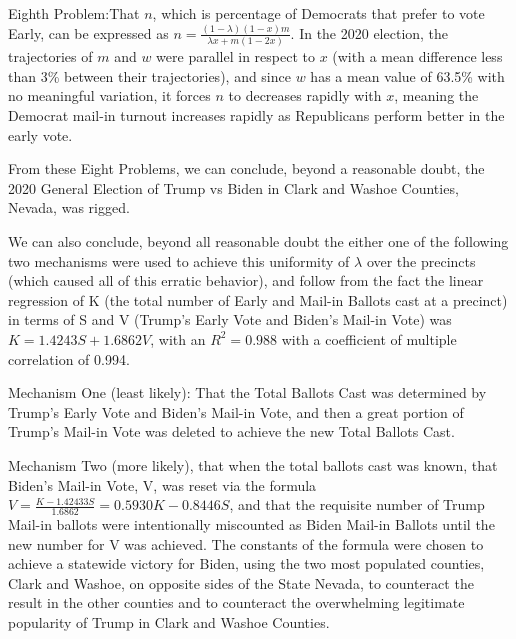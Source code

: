 Eighth Problem:That $n$, which is percentage of Democrats that prefer to vote Early, can be expressed as $n=\frac{(1-\lambda)(1-x)m}{\lambda x+m(1-2x)}$. In the 2020 election, the trajectories of $m$ and $w$ were parallel in respect to $x$ (with a mean difference less than 3\% between their trajectories), and since $w$ has a mean value of 63.5\% with no meaningful variation, it forces $n$ to decreases rapidly with $x$, meaning the Democrat mail-in turnout increases rapidly as Republicans perform better in the early vote.

From these Eight Problems, we can conclude, beyond a reasonable doubt, the 2020 General Election of Trump vs Biden in Clark and Washoe Counties, Nevada, was rigged.

We can also conclude, beyond all reasonable doubt the either one of the following two mechanisms were used to achieve this uniformity of $\lambda$ over the precincts (which caused all of this erratic behavior), and follow from the fact the linear regression of K (the total number of Early and Mail-in Ballots cast at a precinct) in terms of S and V (Trump's Early Vote and Biden's Mail-in Vote) was $K=1.4243S+1.6862V$, with an $R^2=0.988$ with a coefficient of multiple correlation of 0.994.

Mechanism One (least likely): That the Total Ballots Cast was determined by Trump's Early Vote and Biden's Mail-in Vote, and then a great portion of Trump's Mail-in Vote was deleted to achieve the new Total Ballots Cast.

Mechanism Two (more likely), that when the total ballots cast was known, that Biden's Mail-in Vote, V, was reset via the formula $V=\frac{K-1.42433S}{1.6862}=0.5930K-0.8446S$, and that the requisite number of Trump Mail-in ballots were intentionally miscounted as Biden Mail-in Ballots until the new number for V was achieved. The constants of the formula were chosen to achieve a statewide victory for Biden, using the two most populated counties, Clark and Washoe, on opposite sides of the State Nevada, to counteract the result in the other counties and to counteract the overwhelming legitimate popularity of Trump in Clark and Washoe Counties.

